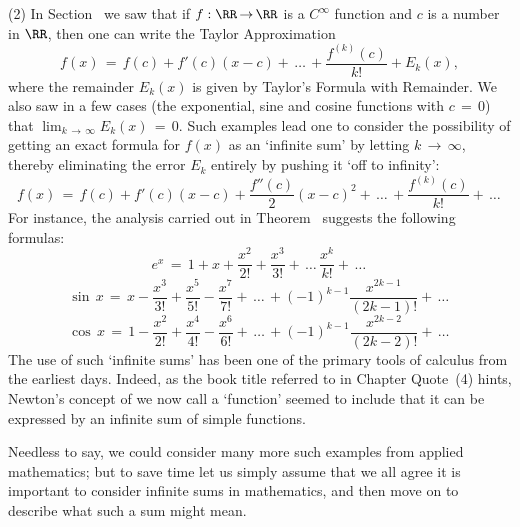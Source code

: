         (2) In Section~ we saw that if $f:{\RR} \,{\rightarrow}\, {\RR}$ is a $C^{{\infty}}$ function and $c$ is a number in ${\RR}$,
    then one can write the Taylor Approximation
        \begin{displaymath}
        f(x) \,=\, f(c) + f'(c)(x-c) + \,{\ldots}\,+ \frac{f^{(k)}(c)}{k!} + E_{k}(x),
        \end{displaymath}
    where the remainder $E_{k}(x)$ is given by Taylor's Formula with Remainder.
    We also saw in a few cases (the exponential, sine and cosine functions with $c \,=\, 0$) that $\lim_{k \,{\rightarrow}\, {\infty}} E_{k}(x) \,=\, 0$.
    Such examples lead one to consider the possibility of getting an exact formula for $f(x)$ as an `infinite sum' by letting $k \,{\rightarrow}\, {\infty}$, thereby eliminating the error $E_{k}$ entirely by pushing it `off to infinity':
        \begin{displaymath}
        f(x) \,=\, f(c) + f'(c)(x-c) + \frac{f''(c)}{2}(x-c)^{2} + \,{\ldots}\,+ \frac{f^{(k)}(c)}{k!} + \,{\ldots}\,
        \end{displaymath}
    For instance, the analysis carried out in Theorem~ suggests the following formulas:
        \begin{displaymath}
        e^{x} \,=\, 1+x+\frac{x^{2}}{2!} + \frac{x^{3}}{3!} + \,{\ldots}\,\frac{x^{k}}{k!} + \,{\ldots}\,
        \end{displaymath}
        \begin{displaymath}
        {\sin}\,x \,=\, x - \frac{x^{3}}{3!} + \frac{x^{5}}{5!} - \frac{x^{7}}{7!} + \,{\ldots}\, + (-1)^{k-1}\frac{x^{2k-1}}{(2k-1)!} + \,{\ldots}\,
        \end{displaymath}
        \begin{displaymath}
        {\cos}\,x \,=\, 1 - \frac{x^{2}}{2!} + \frac{x^{4}}{4!} - \frac{x^{6}}{6!} + \,{\ldots}\,+ (-1)^{k-1}\frac{x^{2k-2}}{(2k-2)!} + \,{\ldots}\,
        \end{displaymath}
    The use of such `infinite sums' has been one of the primary tools of calculus from the earliest days.
    Indeed, as the book title referred to in Chapter Quote~(4) hints, Newton's concept of we now call a `function' seemed to include that it can be expressed by an infinite sum of simple functions.


\V

        Needless to say, we could consider many more such examples from applied mathematics;
    but to save time let us simply assume that we all agree it is important to consider infinite sums in mathematics,
    and then move on to describe what such a sum might mean.


